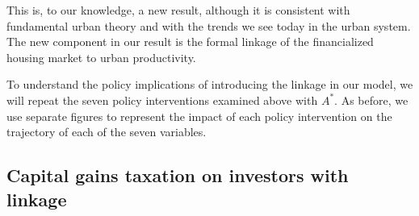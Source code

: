 This is, to our knowledge, a new result, although it is consistent with fundamental urban theory and with the trends we see today in the urban system. The new component in our result is the formal linkage of the financialized housing market to urban productivity.




To understand the policy implications of introducing the linkage in our model, we will repeat the seven policy interventions examined above with  $A^*$.  As before, we use separate figures to represent the impact of each policy intervention on the trajectory of each of the seven variables. 




\newpage
\subsection{Capital gains taxation on investors with linkage}\label{subsec:CGinvest}
